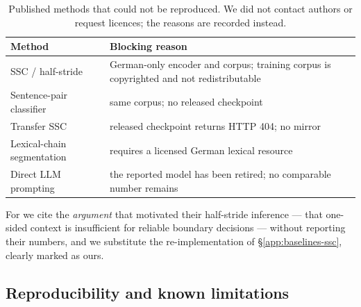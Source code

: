 \begin{table}[t]
\centering\small
\begin{tabular}{@{}p{}p{}@{}}
\toprule
Method & Blocking reason \\
\midrule
SSC / half-stride \citep{zehe2025assessing} &
German-only encoder and corpus; training corpus is copyrighted and not
redistributable \\
Sentence-pair classifier \citep{zehe2021detecting} &
same corpus; no released checkpoint \\
Transfer SSC \citep{kurfali2021breaking} &
released checkpoint returns HTTP 404; no mirror \\
Lexical-chain segmentation \citep{barth2021participation} &
requires a licensed German lexical resource \\
Direct LLM prompting \citep{michelmann2025large} &
the reported model has been retired; no comparable number remains \\
\bottomrule
\end{tabular}
\caption{Published methods that could not be reproduced. We did not contact
authors or request licences; the reasons are recorded instead.}
\label{tab:app-unrepro}
\end{table}

For \citet{zehe2025assessing} we cite the \emph{argument} that motivated their
half-stride inference --- that one-sided context is insufficient for reliable
boundary decisions --- without reporting their numbers, and we substitute the
re-implementation of \S\ref{app:baselines-ssc}, clearly marked as ours.

\subsection{Reproducibility and known limitations}
\label{app:baselines-limits}

